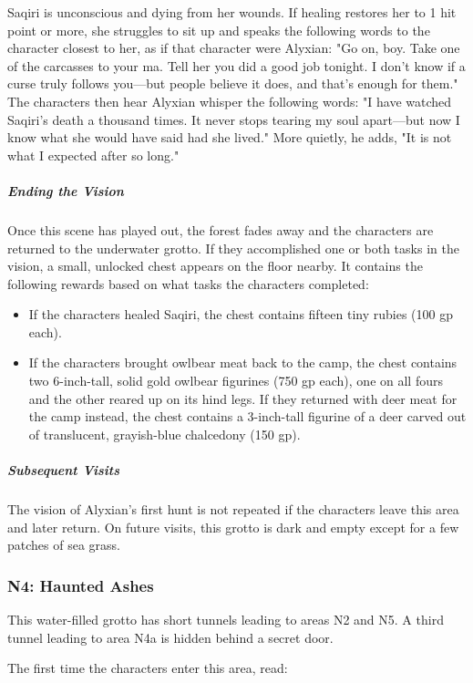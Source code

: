 \documentclass[10pt,a4paper,twoside,bg=print,twocolumn,openany,nodeprecatedcode]{dndbook}
\begin{document}
Saqiri is unconscious and dying from her wounds. If healing restores her to 1 hit point or more, she struggles to sit up and speaks the following words to the character closest to her, as if that character were Alyxian: "Go on, boy. Take one of the carcasses to your ma. Tell her you did a good job tonight. I don't know if a curse truly follows you—but people believe it does, and that's enough for them." The characters then hear Alyxian whisper the following words: "I have watched Saqiri's death a thousand times. It never stops tearing my soul apart—but now I know what she would have said had she lived." More quietly, he adds, "It is not what I expected after so long."

\subparagraph{Ending the Vision}
Once this scene has played out, the forest fades away and the characters are returned to the underwater grotto. If they accomplished one or both tasks in the vision, a small, unlocked chest appears on the floor nearby. It contains the following rewards based on what tasks the characters completed:


\begin{itemize}
\item If the characters healed Saqiri, the chest contains fifteen tiny rubies (100 gp each).
\item If the characters brought owlbear meat back to the camp, the chest contains two 6-inch-tall, solid gold owlbear figurines (750 gp each), one on all fours and the other reared up on its hind legs. If they returned with deer meat for the camp instead, the chest contains a 3-inch-tall figurine of a deer carved out of translucent, grayish-blue chalcedony (150 gp).
\end{itemize}

\subparagraph{Subsequent Visits}
The vision of Alyxian's first hunt is not repeated if the characters leave this area and later return. On future visits, this grotto is dark and empty except for a few patches of sea grass.

\subsubsection{N4: Haunted Ashes}
This water-filled grotto has short tunnels leading to areas N2 and N5. A third tunnel leading to area N4a is hidden behind a secret door.

The first time the characters enter this area, read:
\end{document}
